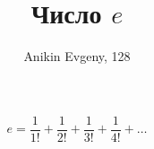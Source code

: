 \documentclass{article}
\title{Число $e$}
\author{Anikin Evgeny, 128}
\begin{document}
\maketitle
$$
e = \frac{1}{1!} + \frac{1}{2!} + \frac{1}{3!} + \frac{1}{4!} + \dots
$$
\end{document}
